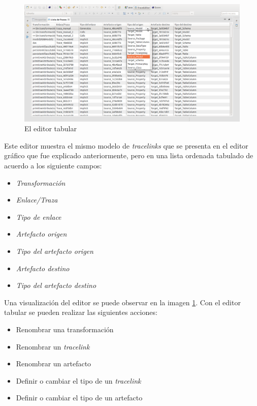 \documentclass[a4paper,12pt,twoside,spanish,openright]{book}
\begin{document}
\begin{figure}[hbtp]
\centering
\includegraphics[scale=.29]{./img/TraceEditorTabular}
\caption{El editor tabular}
\label{fig:TraceEditorTabular}
\end{figure}

Este editor muestra el mismo modelo de \textit{tracelinks} que se presenta en el editor gráfico que fue explicado anteriormente, pero en una lista ordenada tabulado de acuerdo a los siguiente campos:

\begin{itemize}
\item \textsf{\textit{Transformación}}
\item \textsf{\textit{Enlace/Traza}}
\item \textsf{\textit{Tipo de enlace}}
\item \textsf{\textit{Artefacto origen}}
\item \textsf{\textit{Tipo del artefacto origen}}
\item \textsf{\textit{Artefacto destino}}
\item \textsf{\textit{Tipo del artefacto destino}}
\end{itemize}


Una visualización del editor se puede observar en la imagen \ref{fig:TraceEditorTabular}. Con el editor tabular se pueden realizar las siguientes acciones:

\begin{itemize}
\item Renombrar una transformación
\item Renombrar un \textit{tracelink}
\item Renombrar un artefacto
\item Definir o cambiar el tipo de un \textit{tracelink}
\item Definir o cambiar el tipo de un artefacto
\end{itemize}
\end{document}

